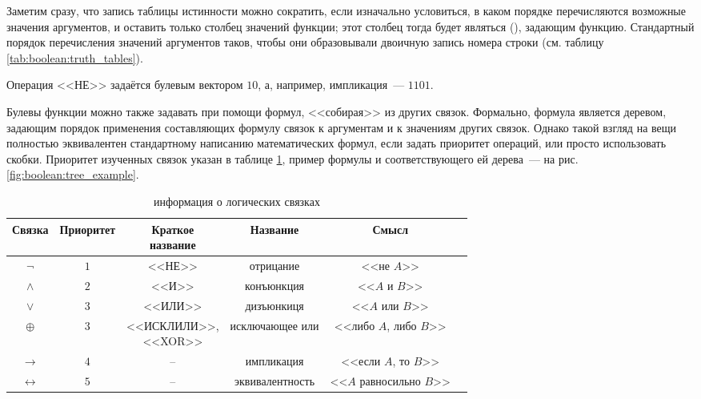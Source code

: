 
Заметим сразу, что запись таблицы истинности можно сократить, если изначально условиться, в каком порядке перечисляются возможные значения аргументов, и оставить только столбец значений функции;
этот столбец тогда будет являться  (), задающим функцию.
Стандартный порядок перечисления значений аргументов таков, чтобы они образовывали двоичную запись номера строки (см. таблицу \ref{tab:boolean:truth_tables}).

\begin{example}
    Операция <<НЕ>> задаётся булевым вектором $ 10 $, а, например, импликация~--- $ 1101 $.
\end{example}

Булевы функции можно также задавать при помощи формул, <<собирая>> из других связок.
Формально, формула является деревом, задающим порядок применения составляющих формулу связок к аргументам и к значениям других связок.
Однако такой взгляд на вещи полностью эквивалентен стандартному написанию математических формул, если задать приоритет операций, или просто использовать скобки.
Приоритет изученных связок указан в таблице \ref{tab:boolean:full_info}, пример формулы и соответствующего ей дерева~--- на рис. \ref{fig:boolean:tree_example}.

\begin{table}[ht!]
    \center
    \begin{tabular}{|c|c|c|c|c|c|}
        \hline
        Связка               & Приоритет & \makecell{Краткое \\ название}     & Название        & Смысл                       \\
        \hline
        \hline
        $ \neg $             & $ 1 $     & <<НЕ>>                             & отрицание       & <<не $ A $>>                \\
        $ \wedge $           & $ 2 $     & <<И>>                              & конъюнкция      & <<$ A $ и $ B $>>           \\
        $ \vee $             & $ 3 $     & <<ИЛИ>>                            & дизъюнкиця      & <<$ A $ или $ B $>>         \\
        $ \oplus $           & $ 3 $     & \makecell{<<ИСКЛИЛИ>>, \\ <<XOR>>} & исключающее или & <<либо $ A $, либо $ B $>>  \\
        $ \rightarrow $      & $ 4 $     & --                                 & импликация      & <<если $ A $, то $ B $>>    \\
        $ \leftrightarrow $  & $ 5 $     & --                                 & эквивалентность & <<$ A $ равносильно $ B $>> \\
        \hline
    \end{tabular}
    \caption{информация о логических связках}
    \label{tab:boolean:full_info}
\end{table}


